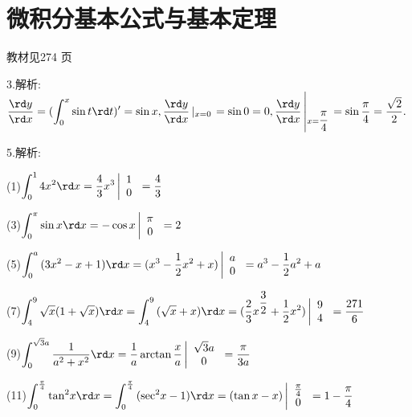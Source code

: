 \section{微积分基本公式与基本定理}
\begin{flushright}
  \color{zhanqing!80}
  \color{zhanqing!80}
   教材见274 页 %
\end{flushright}
3.解析:$\dfrac{{\rd y}}{{\rd x}} = (\displaystyle\int_0^x {\sin t\rd t} )' = \sin x,\dfrac{{\rd y}}{{\rd x}}\left| {_{x = 0}} \right. = \sin 0 = 0,\dfrac{{\rd y}}{{\rd x}}\left| {_{x = \dfrac{\pi }{4}}} \right. = \sin \dfrac{\pi }{4} = \dfrac{{\sqrt 2 }}{2}.$

5.解析:

(1)$\displaystyle\int_0^1 {4{x^2}} \rd x = \frac{4}{3}{x^3}\left| {\begin{array}{*{20}{c}}
  1 \\ 
  0 
\end{array}} \right. = \dfrac{4}{3}$

(3)$\displaystyle\int_0^\pi  {\sin x\rd x}  =  - \cos x\left| {\begin{array}{*{20}{c}}
  \pi  \\ 
  0 
\end{array}} \right. = 2$

(5)$\displaystyle\int_0^a {(3{x^2}}  - x + 1)\rd x = ({x^3} - \dfrac{1}{2}{x^2} + x)\left| {\begin{array}{*{20}{c}}
  a \\ 
  0 
\end{array}} \right. = {a^3} - \dfrac{1}{2}{a^2} + a$

(7)$\displaystyle\int_4^9 {\sqrt x } (1 + \sqrt x )\rd x = \displaystyle\int_4^9 {(\sqrt x  + x} )\rd x = (\dfrac{2}{3}{x^{\dfrac{3}{2}}} + \dfrac{1}{2}{x^2})\left| {\begin{array}{*{20}{c}}
  9 \\ 
  4 
\end{array}} \right. = \dfrac{{271}}{6}$

(9)$\displaystyle\int_0^{\sqrt 3 a} {\dfrac{1}{{{a^2} + {x^2}}}} \rd x = \dfrac{1}{a}\arctan \dfrac{x}{a}\left| {\begin{array}{*{20}{c}}
  {\sqrt 3 a} \\ 
  0 
\end{array}} \right. = \dfrac{\pi }{{3a}}$

(11)$\displaystyle\int_0^{\frac{\pi }{4}} {{{\tan }^2}} x\rd x = \displaystyle\int_0^{\frac{\pi }{4}} {({{\sec }^2}x - 1} )\rd x = (\tan x - x)\left| {\begin{array}{*{20}{c}}
  {\frac{\pi }{4}} \\ 
  0 
\end{array}} \right. = 1 - \dfrac{\pi }{4}$

